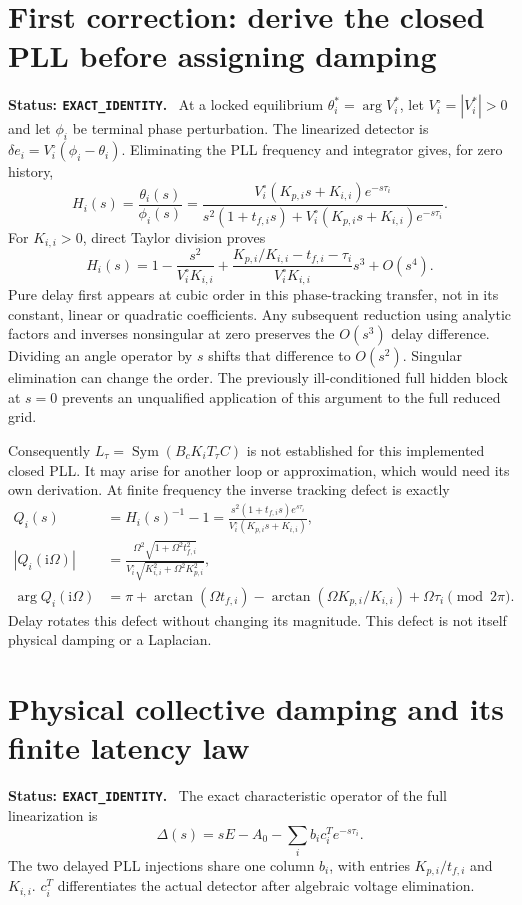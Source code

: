 \documentclass[11pt]{article}
\newcommand{\ii}{\mathrm{i}}
\newcommand{\status}[1]{\par\smallskip\noindent\textbf{Status: \texttt{#1}.}\ }
\begin{document}
\section{First correction: derive the closed PLL before assigning damping}
\status{EXACT\_IDENTITY}
At a locked equilibrium $\theta_i^*=\arg V_i^*$, let
$V_i^\circ=|V_i^*|>0$ and let $\phi_i$ be terminal phase perturbation.
The linearized detector is $\delta e_i=V_i^\circ(\phi_i-\theta_i)$.
Eliminating the PLL frequency and integrator gives, for zero history,
\begin{equation}
 H_i(s)=\frac{\theta_i(s)}{\phi_i(s)}
 =\frac{V_i^\circ(K_{p,i}s+K_{i,i})e^{-s\tau_i}}
 {s^2(1+t_{f,i}s)+V_i^\circ(K_{p,i}s+K_{i,i})e^{-s\tau_i}}. \label{eq:H}
\end{equation}
For $K_{i,i}>0$, direct Taylor division proves
\begin{equation}
 H_i(s)=1-\frac{s^2}{V_i^\circ K_{i,i}}
 +\frac{K_{p,i}/K_{i,i}-t_{f,i}-\tau_i}{V_i^\circ K_{i,i}}s^3+O(s^4).
 \label{eq:series}
\end{equation}
Pure delay first appears at cubic order in this phase-tracking transfer,
not in its constant, linear or quadratic coefficients.
Any subsequent reduction using analytic factors and inverses nonsingular
at zero preserves the $O(s^3)$ delay difference. Dividing an angle
operator by $s$ shifts that difference to $O(s^2)$.
Singular elimination can change the order. The previously ill-conditioned
full hidden block at $s=0$ prevents an unqualified application of this
argument to the full reduced grid.

Consequently $L_\tau=\operatorname{Sym}(B_cK_iT_\tau C)$ is not established
for this implemented closed PLL. It may arise for another loop or
approximation, which would need its own derivation.
At finite frequency the inverse tracking defect is exactly
\begin{align}
 Q_i(s)&=H_i(s)^{-1}-1
 =\frac{s^2(1+t_{f,i}s)e^{s\tau_i}}{V_i^\circ(K_{p,i}s+K_{i,i})},\\
 |Q_i(\ii\Omega)|&=
 \frac{\Omega^2\sqrt{1+\Omega^2t_{f,i}^2}}
 {V_i^\circ\sqrt{K_{i,i}^2+\Omega^2K_{p,i}^2}},\\
 \arg Q_i(\ii\Omega)&=\pi+\arctan(\Omega t_{f,i})
 -\arctan(\Omega K_{p,i}/K_{i,i})+\Omega\tau_i\pmod{2\pi}.
\end{align}
Delay rotates this defect without changing its magnitude. This defect
is not itself physical damping or a Laplacian.

\section{Physical collective damping and its finite latency law}
\status{EXACT\_IDENTITY}
The exact characteristic operator of the full linearization is
\[
 \Delta(s)=sE-A_0-\sum_i b_ic_i^T e^{-s\tau_i}.
\]
The two delayed PLL injections share one column $b_i$, with entries
$K_{p,i}/t_{f,i}$ and $K_{i,i}$. $c_i^T$ differentiates the actual
detector after algebraic voltage elimination.
\end{document}
